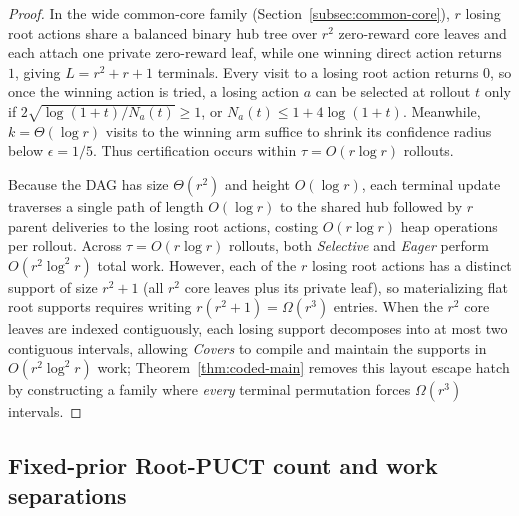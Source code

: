 \documentclass{article}
\theoremstyle{plain}
\theoremstyle{definition}
\begin{document}
\begin{proof}
In the wide common-core family (Section~\ref{subsec:common-core}), $r$ losing root actions share a balanced binary hub tree over $r^2$ zero-reward core leaves and each attach one private zero-reward leaf, while one winning direct action returns $1$, giving $L = r^2 + r + 1$ terminals. Every visit to a losing root action returns $0$, so once the winning action is tried, a losing action $a$ can be selected at rollout $t$ only if $2\sqrt{\log(1+t)/N_a(t)} \ge 1$, or $N_a(t) \le 1 + 4\log(1+t)$. Meanwhile, $k = \Theta(\log r)$ visits to the winning arm suffice to shrink its confidence radius below $\epsilon = 1/5$. Thus certification occurs within $\tau = O(r \log r)$ rollouts.

Because the DAG has size $\Theta(r^2)$ and height $O(\log r)$, each terminal update traverses a single path of length $O(\log r)$ to the shared hub followed by $r$ parent deliveries to the losing root actions, costing $O(r \log r)$ heap operations per rollout. Across $\tau = O(r \log r)$ rollouts, both \emph{Selective} and \emph{Eager} perform $O(r^2 \log^2 r)$ total work. However, each of the $r$ losing root actions has a distinct support of size $r^2 + 1$ (all $r^2$ core leaves plus its private leaf), so materializing flat root supports requires writing $r(r^2 + 1) = \Omega(r^3)$ entries. When the $r^2$ core leaves are indexed contiguously, each losing support decomposes into at most two contiguous intervals, allowing \emph{Covers} to compile and maintain the supports in $O(r^2 \log^2 r)$ work; Theorem~\ref{thm:coded-main} removes this layout escape hatch by constructing a family where \emph{every} terminal permutation forces $\Omega(r^3)$ intervals.
\end{proof}



\subsection{Fixed-prior Root-PUCT count and work separations}
\label{app:root-puct-proofs}
\end{document}
